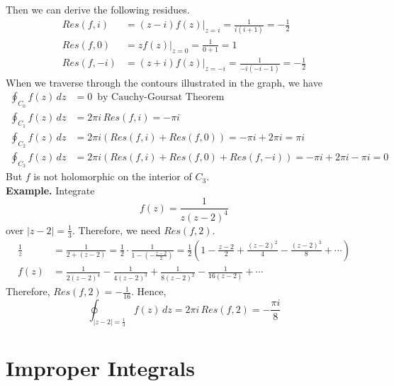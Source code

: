 \documentclass[11pt]{article}
\begin{document}
Then we can derive the following residues. 
\begin{align*}
Res(f, i) &= (z - i)f(z) \bigg\rvert_{z = i} = \frac{1}{i(i + 1)} = -\frac{1}{2}\\
Res(f, 0) &= zf(z) \bigg\rvert_{z = 0} = \frac{1}{0 + 1} = 1 \\
Res(f, -i) &= (z + i)f(z) \bigg\rvert_{z = -i} = \frac{1}{-i(-i - 1)} = -\frac{1}{2}
\end{align*}
When we traverse through the contours illustrated in the graph, we have 
\begin{align*}
\oint_{C_0}f(z)\,dz &= 0 \, \mbox{ by Cauchy-Goursat Theorem}\\
\oint_{C_1}f(z)\,dz &= 2\pi i \,Res(f,i) = -\pi i\\
\oint_{C_2}f(z)\,dz &= 2\pi i\left(Res(f, i) + Res(f, 0)\right) = -\pi i + 2\pi i = \pi i\\
\oint_{C_3}f(z)\,dz &= 2\pi i\left(Res(f, i) + Res(f, 0) + Res(f, -i)\right) =  -\pi i + 2\pi i - \pi i = 0
\end{align*}
But $f$ is not holomorphic on the interior of $C_3$. \\
\newpage
\textbf{Example.} Integrate
$$f(z) = \frac{1}{z(z - 2)^4}$$
over $|z - 2| = \frac{1}{3}$. Therefore, we need $Res(f, 2)$.
\begin{align*}
\frac{1}{z} &= \frac{1}{2 + (z - 2)} = \frac{1}{2} \cdot \frac{1}{1 - (-\frac{z - 2}{2})} = \frac{1}{2}\left(1 - \frac{z - 2}{2} + \frac{(z - 2)^2}{4} - \frac{(z - 2)^3}{8} + \cdots\right) \\
f(z) &= \frac{1}{2(z - 2)^4} - \frac{1}{4(z - 2)^3} + \frac{1}{8(z - 2)^2} - \frac{1}{16(z - 2)} + \cdots 
\end{align*}
Therefore, $Res(f, 2) = -\frac{1}{16}$. Hence, 
$$\oint_{|z - 2| = \frac{1}{3}}f(z) \, dz = 2\pi i \, Res(f, 2) = -\frac{\pi i}{8} $$

\newpage
\section{Improper Integrals}
\end{document}
